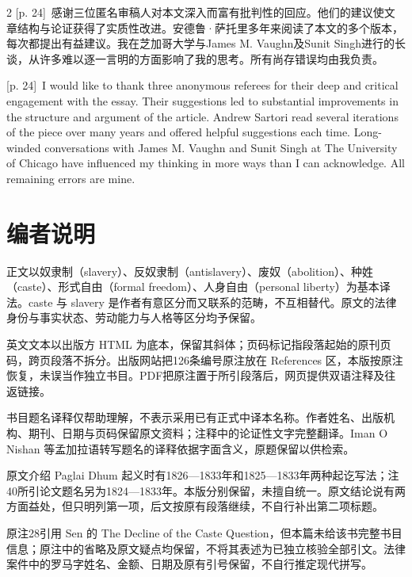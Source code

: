 \documentclass[10pt,a4paper]{article}
\begin{document}
\begin{paracol}{2}
{\scriptsize\color{gray} [p. 24]}\ 感谢三位匿名审稿人对本文深入而富有批判性的回应。他们的建议使文章结构与论证获得了实质性改进。安德鲁·萨托里多年来阅读了本文的多个版本，每次都提出有益建议。我在芝加哥大学与James M. Vaughn及Sunit Singh进行的长谈，从许多难以逐一言明的方面影响了我的思考。所有尚存错误均由我负责。\par
\switchcolumn
{\scriptsize\color{gray} [p. 24]}\ I would like to thank three anonymous referees for their deep and critical engagement with the essay. Their suggestions led to substantial improvements in the structure and argument of the article. Andrew Sartori read several iterations of the piece over many years and offered helpful suggestions each time. Long-winded conversations with James M. Vaughn and Sunit Singh at The University of Chicago have influenced my thinking in more ways than I can acknowledge. All remaining errors are mine.\par
\switchcolumn*
\end{paracol}
\section*{编者说明}
正文以奴隶制（slavery）、反奴隶制（antislavery）、废奴（abolition）、种姓（caste）、形式自由（formal freedom）、人身自由（personal liberty）为基本译法。caste 与 slavery 是作者有意区分而又联系的范畴，不互相替代。原文的法律身份与事实状态、劳动能力与人格等区分均予保留。\par
英文文本以出版方 HTML 为底本，保留其斜体；页码标记指段落起始的原刊页码，跨页段落不拆分。出版网站把126条编号原注放在 References 区，本版按原注恢复，未误当作独立书目。PDF把原注置于所引段落后，网页提供双语注释及往返链接。\par
书目题名译释仅帮助理解，不表示采用已有正式中译本名称。作者姓名、出版机构、期刊、日期与页码保留原文资料；注释中的论证性文字完整翻译。Iman O Nishan 等孟加拉语转写题名的译释依据字面含义，原题保留以供检索。\par
原文介绍 Paglai Dhum 起义时有1826—1833年和1825—1833年两种起讫写法；注40所引论文题名另为1824—1833年。本版分别保留，未擅自统一。原文结论说有两方面益处，但只明列第一项，后文按原有段落继续，不自行补出第二项标题。\par
原注28引用 Sen 的 The Decline of the Caste Question，但本篇未给该书完整书目信息；原注中的省略及原文疑点均保留，不将其表述为已独立核验全部引文。法律案件中的罗马字姓名、金额、日期及原有引号保留，不自行推定现代拼写。\par
\end{document}
